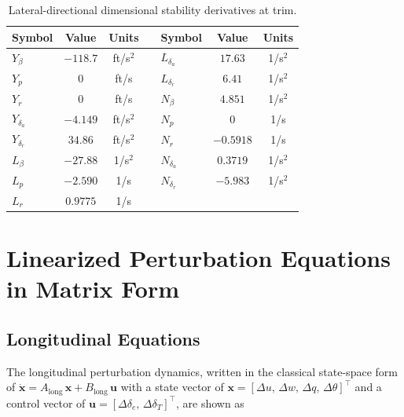 \documentclass[11pt]{article}
\begin{document}
\begin{table}[h]\label{tab:table_4}
\centering
\caption{Lateral-directional dimensional stability derivatives at trim.}
\begin{tabular}{lcc l lcc}
\toprule
\textbf{Symbol} & \textbf{Value} & \textbf{Units} & \quad &
\textbf{Symbol} & \textbf{Value} & \textbf{Units} \\
\midrule
$Y_\beta$        & $-118.7$  & ft/s$^2$ & & $L_{\delta_a}$ & $17.63$   & 1/s$^2$ \\
$Y_p$            & $0$       & ft/s     & & $L_{\delta_r}$ & $6.41$    & 1/s$^2$ \\
$Y_r$            & $0$       & ft/s     & & $N_\beta$      & $4.851$   & 1/s$^2$ \\
$Y_{\delta_a}$   & $-4.149$  & ft/s$^2$ & & $N_p$          & $0$       & 1/s     \\
$Y_{\delta_r}$   & $34.86$   & ft/s$^2$ & & $N_r$          & $-0.5918$ & 1/s     \\
$L_\beta$        & $-27.88$  & 1/s$^2$  & & $N_{\delta_a}$ & $0.3719$  & 1/s$^2$ \\
$L_p$            & $-2.590$  & 1/s      & & $N_{\delta_r}$ & $-5.983$  & 1/s$^2$ \\
$L_r$            & $0.9775$  & 1/s      & &                &           &         \\
\bottomrule
\end{tabular}
\end{table}

\newpage

\section{Linearized Perturbation Equations in Matrix Form}

\subsection{Longitudinal Equations}

The longitudinal perturbation dynamics, written in the classical state-space form of
$\dot{\mathbf{x}} = A_\text{long}\,\mathbf{x} + B_\text{long}\,\mathbf{u}$ with a
state vector of $\mathbf{x} = [\Delta u,\,\Delta w,\,\Delta q,\,\Delta\theta]^\top$
and a control vector of $\mathbf{u} = [\Delta\delta_e,\,\Delta\delta_T]^\top$, are shown as
\end{document}
